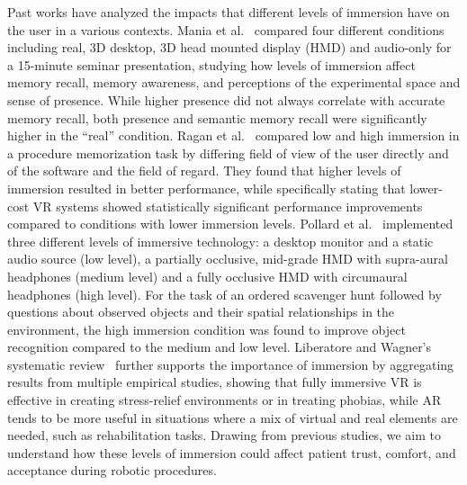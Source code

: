 Past works have analyzed the impacts that different levels of immersion have on the user in a various contexts. Mania et al.~\cite{mania2001effects} compared four different conditions including real, 3D desktop, 3D head mounted display (HMD) and audio-only for a 15-minute seminar presentation, studying how levels of immersion affect memory recall, memory awareness, and perceptions of the experimental space and sense of presence. While higher presence did not always correlate with accurate memory recall, both presence and semantic memory recall were significantly higher in the ``real'' condition. Ragan et al.~\cite{ragan2010effects} compared low and high immersion in a procedure memorization task by differing field of view of the user directly and of the software and the field of regard. They found that higher levels of immersion resulted in better performance, while specifically stating that lower-cost VR systems showed statistically significant performance improvements compared to conditions with lower immersion levels. Pollard et al.~\cite{pollard2020level} implemented three different levels of  immersive technology: a desktop monitor and a static audio source (low level), a partially occlusive, mid-grade HMD with supra-aural headphones (medium level) and a fully occlusive HMD with circumaural headphones (high level). For the task of an ordered scavenger hunt followed by questions about observed objects and their spatial relationships in the environment, the high immersion condition was found to improve object recognition compared to the medium and low level.
Liberatore and Wagner’s systematic review~\cite{liberatore2021virtual} further supports the importance of immersion by aggregating results from multiple empirical studies, showing that fully immersive VR is effective in creating stress-relief environments or in treating phobias, while AR tends to be more useful in situations where a mix of virtual and real elements are needed, such as rehabilitation tasks.
Drawing from previous studies, we aim to understand how these levels of immersion could affect patient trust, comfort, and acceptance during robotic procedures.
